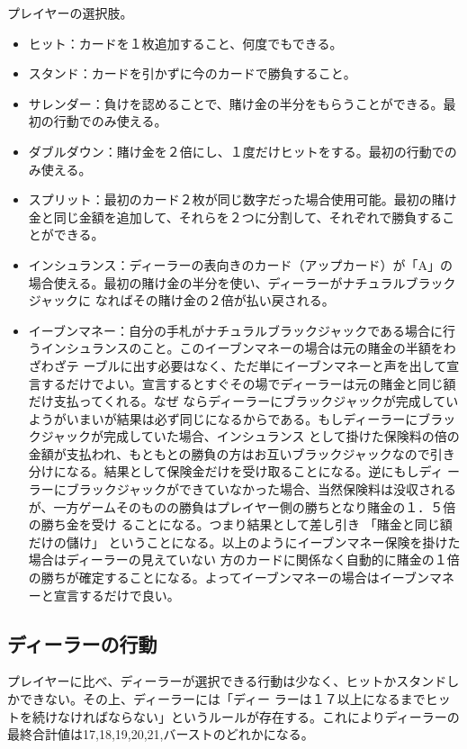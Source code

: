 プレイヤーの選択肢。
\begin{itemize}
\item ヒット：カードを１枚追加すること、何度でもできる。
\item スタンド：カードを引かずに今のカードで勝負すること。
\item サレンダー：負けを認めることで、賭け金の半分をもらうことができる。最初の行動でのみ使える。
\item ダブルダウン：賭け金を２倍にし、１度だけヒットをする。最初の行動でのみ使える。
\item スプリット：最初のカード２枚が同じ数字だった場合使用可能。最初の賭け金と同じ金額を追加して、それらを２つに分割して、それぞれで勝負することができる。
\item インシュランス：ディーラーの表向きのカード（アップカード）が「A」の場合使える。最初の賭け金の半分を使い、ディーラーがナチュラルブラックジャックに
なればその賭け金の２倍が払い戻される。
\item イーブンマネー：自分の手札がナチュラルブラックジャックである場合に行うインシュランスのこと。このイーブンマネーの場合は元の賭金の半額をわざわざテ
ーブルに出す必要はなく、ただ単にイーブンマネーと声を出して宣言するだけでよい。宣言するとすぐその場でディーラーは元の賭金と同じ額だけ支払ってくれる。なぜ
ならディーラーにブラックジャックが完成していようがいまいが結果は必ず同じになるからである。もしディーラーにブラックジャックが完成していた場合、インシュランス
として掛けた保険料の倍の金額が支払われ、もともとの勝負の方はお互いブラックジャックなので引き分けになる。結果として保険金だけを受け取ることになる。逆にもしディ
ーラーにブラックジャックができていなかった場合、当然保険料は没収されるが、一方ゲームそのものの勝負はプレイヤー側の勝ちとなり賭金の１．５倍の勝ち金を受け
ることになる。つまり結果として差し引き 「賭金と同じ額だけの儲け」 ということになる。以上のようにイーブンマネー保険を掛けた場合はディーラーの見えていない
方のカードに関係なく自動的に賭金の１倍の勝ちが確定することになる。よってイーブンマネーの場合はイーブンマネーと宣言するだけで良い。
\end{itemize}

\subsection{ディーラーの行動}
プレイヤーに比べ、ディーラーが選択できる行動は少なく、ヒットかスタンドしかできない。その上、ディーラーには「ディー
ラーは１７以上になるまでヒットを続けなければならない」というルールが存在する。これによりディーラーの最終合計値は17,18,19,20,21,バーストのどれかになる。

